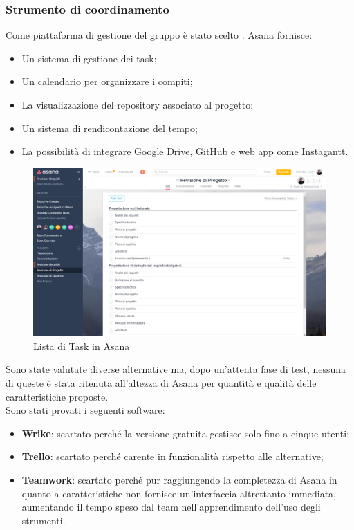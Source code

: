 \documentclass[../NormeDiProgetto.tex]{subfiles}
\begin{document}
			\subsubsection{Strumento di coordinamento}
			Come piattaforma di gestione del gruppo è stato scelto . Asana fornisce:
			\begin{itemize}
				\item Un sistema di gestione dei task;
				\item Un calendario per organizzare i compiti;
				\item La visualizzazione del repository associato al progetto;
				\item Un sistema di rendicontazione del tempo;
				\item La possibilità di integrare Google Drive, GitHub e web app come Instagantt.
			\end{itemize}
			\begin{figure} [h!]
				\centering
				\includegraphics[scale=0.2]{./Immagini/Asana.png}
				\caption{Lista di Task in Asana}\label{fig:TaskAsana}
			\end{figure}
			Sono state valutate diverse alternative ma, dopo un'attenta fase di test, nessuna di queste è
			stata ritenuta all'altezza di Asana per quantità e qualità delle caratteristiche proposte.\\
			Sono stati provati i seguenti software:
			\begin{itemize}
				\item \textbf{Wrike}: scartato perché la versione gratuita gestisce solo fino a cinque utenti;
				\item \textbf{Trello}: scartato perché carente in funzionalità rispetto alle alternative;  
				\item \textbf{Teamwork}: scartato perché pur raggiungendo la completezza di Asana in quanto
				a caratteristiche non fornisce un'interfaccia altrettanto immediata, aumentando il tempo
				speso dal team nell'apprendimento dell'uso degli strumenti.
			\end{itemize}
\end{document}
